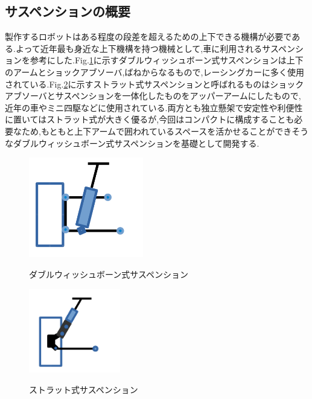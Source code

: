 \documentclass[a4paper]{jarticle}
\begin{document}
\subsection{サスペンションの概要}
製作するロボットはある程度の段差を超えるための上下できる機構が必要である.よって近年最も身近な上下機構を持つ機械として,車に利用されるサスペンションを参考にした.Fig.\ref{fig:doublewish}に示すダブルウィッシュボーン式サスペンションは上下のアームとショックアブソーバ,ばねからなるもので,レーシングカーに多く使用されている.Fig.\ref{fig:strat}に示すストラット式サスペンションと呼ばれるものはショックアブソーバとサスペンションを一体化したものをアッパーアームにしたもので,近年の車やミニ四駆などに使用されている.両方とも独立懸架で安定性や利便性に置いてはストラット式が大きく優るが,今回はコンパクトに構成することも必要なため,もともと上下アームで囲われているスペースを活かせることができそうなダブルウィッシュボーン式サスペンションを基礎として開発する.

\begin{figure}[htbt]
 \begin{center}
  \includegraphics[width=50mm]{img/fig1.png}
 　\caption{ダブルウィッシュボーン式サスペンション}
  \label{fig:doublewish}%
 \end{center}
\end{figure}

\begin{figure}[htbt]
 \begin{center}
  \includegraphics[width=40mm]{img/fig2.png}
 　\caption{ストラット式サスペンション}
  \label{fig:strat}%
 \end{center}
\end{figure}
\end{document}
